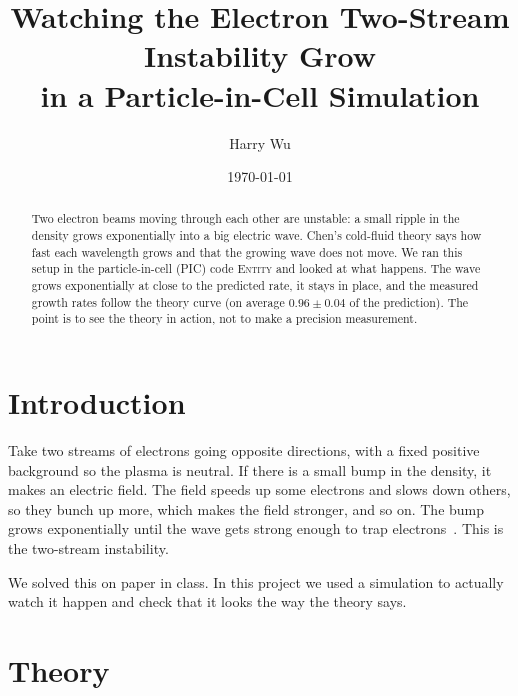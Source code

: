\documentclass[10pt,twocolumn,letterpaper]{article}
\title{\vspace{-1.5em}Watching the Electron Two-Stream Instability Grow\\
       in a Particle-in-Cell Simulation}
\author{Harry Wu}
\date{\today}
\begin{document}
\maketitle

\begin{abstract}
\noindent
Two electron beams moving through each other are unstable: a small ripple in the density grows
exponentially into a big electric wave. Chen's cold-fluid theory says how fast each wavelength
grows and that the growing wave does not move. We ran this setup in the particle-in-cell (PIC)
code \textsc{Entity} and looked at what happens. The wave grows exponentially at close to the
predicted rate, it stays in place, and the measured growth rates follow the theory curve (on
average $0.96\pm0.04$ of the prediction). The point is to see the theory in action, not to make a
precision measurement.
\end{abstract}

\section{Introduction}

Take two streams of electrons going opposite directions, with a fixed positive background so
the plasma is neutral. If there is a small bump in the density, it makes an electric field. The
field speeds up some electrons and slows down others, so they bunch up more, which makes the
field stronger, and so on. The bump grows exponentially until the wave gets strong enough to trap
electrons~\citep{BohmGross1949,Chen2016}. This is the two-stream instability.

We solved this on paper in class. In this project we used a simulation to actually watch it
happen and check that it looks the way the theory says.

\section{Theory}
\end{document}
